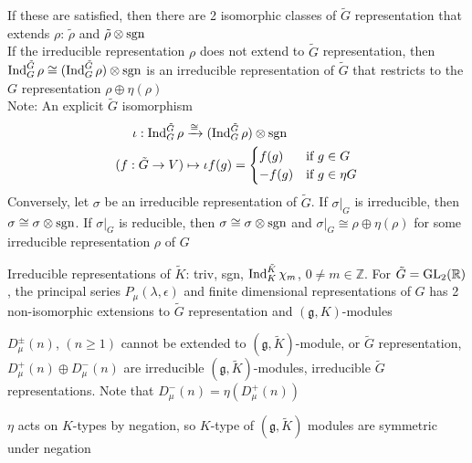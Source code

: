 \documentclass[main]{subfiles}
\begin{document}
If these are satisfied, then there are 2 isomorphic classes of $\tilde G$ representation that extends $\rho$: $\tilde\rho$ and $\tilde\rho\otimes\operatorname{sgn}$ \\
If the irreducible representation $\rho$ does not extend to $\tilde G$ representation, then $\operatorname{Ind}^{\tilde G}_G\rho\cong(\operatorname{Ind}^{\tilde G}_G\rho)\otimes\operatorname{sgn}$ is an irreducible representation of $\tilde G$ that restricts to the $G$ representation $\rho\oplus\eta(\rho)$ \\
Note: An explicit $\tilde G$ isomorphism
\begin{align*}
\iota:\operatorname{Ind}^{\tilde G}_G\rho&\xrightarrow{\cong}(\operatorname{Ind}^{\tilde G}_G\rho)\otimes\operatorname{sgn} \\
(f:\tilde G\to V)&\mapsto\iota f(g)=\begin{cases}
f(g)&\text{if }g\in G \\
-f(g)&\text{if }g\in\eta G
\end{cases}
\end{align*}
Conversely, let $\sigma$ be an irreducible representation of $\tilde G$. If $\sigma|_G$ is irreducible, then $\sigma\cong\sigma\otimes\operatorname{sgn}$. If $\sigma|_G$ is reducible, then $\sigma\cong\sigma\otimes\operatorname{sgn}$ and $\sigma|_G\cong\rho\oplus\eta(\rho)$ for some irreducible representation $\rho$ of $G$

\begin{example}
Irreducible representations of $\tilde K$: triv, sgn, $\operatorname{Ind}^{\tilde K}_K\chi_m$, $0\neq m\in\mathbb Z$. For $\tilde G=\operatorname{GL}_2(\mathbb R)$, the principal series $P_\mu(\lambda,\epsilon)$ and finite dimensional representations of $G$ has 2 non-isomorphic extensions to $\tilde G$ representation and $(\mathfrak g,K)$-modules
\end{example}

$D^{\pm}_\mu(n)$, $(n\geq1)$ cannot be extended to $(\mathfrak g,\tilde K)$-module, or $\tilde G$ representation, $D^+_\mu(n)\oplus D^-_\mu(n)$ are irreducible $(\mathfrak g,\tilde K)$-modules, irreducible $\tilde G$ representations. Note that $D^-_\mu(n)=\eta(D^+_\mu(n))$

\begin{remark}
$\eta$ acts on $K$-types by negation, so $K$-type of $(\mathfrak g,\tilde K)$ modules are symmetric under negation
\end{remark}
\end{document}
